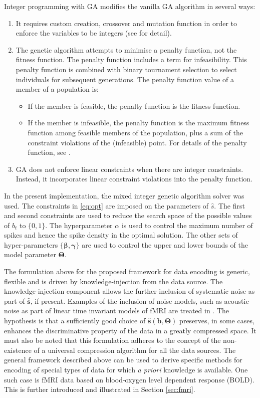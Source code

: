 Integer programming with GA modifies the vanilla GA algorithm in several ways:
\begin{enumerate}
	\item It requires custom creation, crossover and mutation function in order to enforce the variables to be integers (see \citep{deep2009real} for detail).
	\item The genetic algorithm attempts to minimise a penalty function, not the fitness function. The penalty function includes a term for infeasibility. This penalty function is combined with binary tournament selection to select individuals for subsequent generations. The penalty function value of a member of a population is:
		\begin{itemize}
			\item If the member is feasible, the penalty function is the fitness function.
			\item If the member is infeasible, the penalty function is the maximum fitness function among feasible members of the population, plus a sum of the constraint violations of the (infeasible) point. For details of the penalty function, see \citep{deb2000efficient}.
		\end{itemize}
	\item GA  does not enforce linear constraints when there are integer constraints. Instead, it incorporates linear constraint violations into the penalty function.
\end{enumerate}

In the present implementation, the mixed integer genetic algorithm solver \citep{deb2000efficient,deep2009real} was used. The constraints in \equationname \ref{eq:opt} are imposed on the parameters of $\hat{s}$. The first and second constraints are used to reduce the search space of the possible values of $b_t$ to $\{0, 1\}$. The hyperparameter $\alpha$ is used to control the maximum number of spikes and hence the spike density in the optimal solution. The other sets of hyper-parameters $\{\boldsymbol{\beta}, \boldsymbol{\gamma}\}$ are used to control the upper and lower bounds of the model parameter $\boldsymbol{\Theta}$. 

The formulation above for the proposed framework for data encoding is generic, flexible and is driven by knowledge-injection from the data source. The knowledge-injection component allows the further inclusion of systematic noise as part of $\mathbf{\hat{s}}$, if present. Examples of the inclusion of noise models, such as acoustic noise as part of linear time invariant models of fMRI are treated in \citep{sierra2008acoustic, cho1997analysis}. The hypothesis is that a sufficiently good choice of $\mathbf{\hat{s}}(\mathbf{b}, \mathbf{\Theta})$ preserves, in some cases, enhances the discriminative property of the data in a greatly compressed space. It must also be noted that this formulation adheres to the concept of the non-existence of a universal compression algorithm for all the data sources. The general framework described above can be used to derive specific methods for encoding of special types of data for which \emph{a priori} knowledge is available. One such case is fMRI data based on blood-oxygen level dependent response (BOLD). This is further introduced and illustrated in Section \ref{sec:fmri}. 

